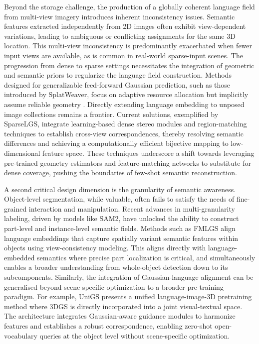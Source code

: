 \documentclass[11pt,a4paper]{article}
\begin{document}
Beyond the storage challenge, the production of a globally coherent language field from multi-view imagery introduces inherent inconsistency issues. Semantic features extracted independently from 2D images often exhibit view-dependent variations, leading to ambiguous or conflicting assignments for the same 3D location. This multi-view inconsistency is predominantly exacerbated when fewer input views are available, as is common in real-world sparse-input scenes. The progression from dense to sparse settings necessitates the integration of geometric and semantic priors to regularize the language field construction. Methods designed for generalizable feed-forward Gaussian prediction, such as those introduced by SplatWeaver, focus on adaptive resource allocation but implicitly assume reliable geometry \cite{arxiv:2605.07287v2}. Directly extending language embedding to unposed image collections remains a frontier. Current solutions, exemplified by SparseLGS, integrate learning-based dense stereo modules and region-matching techniques to establish cross-view correspondences, thereby resolving semantic differences and achieving a computationally efficient bijective mapping to low-dimensional feature space. These techniques underscore a shift towards leveraging pre-trained geometry estimators and feature-matching networks to substitute for dense coverage, pushing the boundaries of few-shot semantic reconstruction.

A second critical design dimension is the granularity of semantic awareness. Object-level segmentation, while valuable, often fails to satisfy the needs of fine-grained interaction and manipulation. Recent advances in multi-granularity labeling, driven by models like SAM2, have unlocked the ability to construct part-level and instance-level semantic fields. Methods such as FMLGS align language embeddings that capture spatially variant semantic features within objects using view-consistency modeling. This aligns directly with language-embedded semantics where precise part localization is critical, and simultaneously enables a broader understanding from whole-object detection down to its subcomponents. Similarly, the integration of Gaussian-language alignment can be generalised beyond scene-specific optimization to a broader pre-training paradigm. For example, UniGS presents a unified language-image-3D pretraining method where 3DGS is directly incorporated into a joint visual-textual space. The architecture integrates Gaussian-aware guidance modules to harmonize features and establishes a robust correspondence, enabling zero-shot open-vocabulary queries at the object level without scene-specific optimization.
\end{document}
